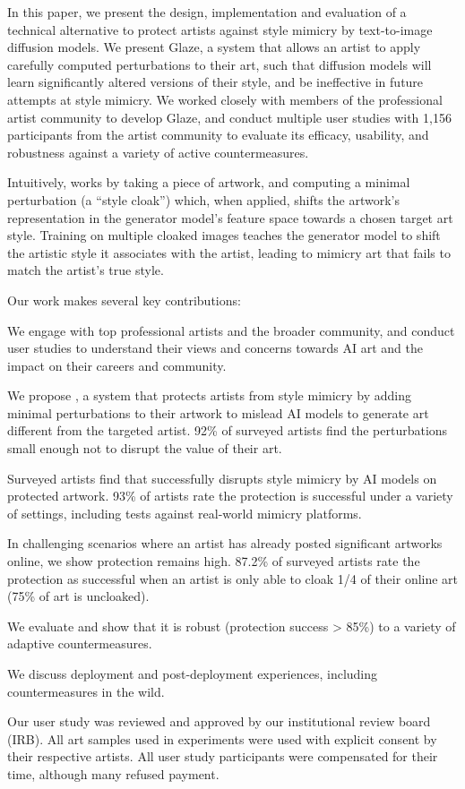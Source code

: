 In this paper, we present the design, implementation and evaluation of a
technical alternative to protect artists against style mimicry by
text-to-image diffusion models. 
We present Glaze, a system that allows an artist to apply carefully
computed perturbations to their art, such that diffusion models will learn
significantly altered versions of their style, and be ineffective in future
attempts at style mimicry. We worked closely with members of the professional
artist community to develop Glaze, and conduct multiple user studies with
1,156 participants from the artist community to evaluate its efficacy,
usability, and robustness against a variety of active countermeasures.

Intuitively, \system{} works by taking a piece of artwork, and computing a
minimal perturbation (a ``style cloak'') which, when applied, shifts the artwork's
representation in the generator model's feature space towards a chosen target
art style. Training on multiple cloaked images teaches the generator model
to shift the artistic style it associates with the artist, leading to mimicry
art that fails to match the artist's true style.

{Our work makes several key contributions:}
\vspace{-0.1in}
\begin{packed_itemize}
\item We engage with top professional artists and the broader community, and
  conduct user studies to understand their views and concerns towards AI art
  and the impact on their careers and community.
\item We propose \system{}, a system that protects artists from style mimicry
  by adding minimal perturbations to their artwork to mislead AI models to
  generate art different from the targeted artist. 92\% of surveyed artists
  find the perturbations small enough not to disrupt the value of their art. 
\item Surveyed artists find that \system{} successfully disrupts
  style mimicry by AI models on protected artwork. 93\% of 
  artists rate the protection is successful under a variety of settings,
  including tests against real-world mimicry platforms.
\item In challenging scenarios where an artist has already posted significant
  artworks online, we show \system{} protection remains high. 87.2\% of
  surveyed artists rate the protection as successful when an artist is only
  able to cloak 1/4 of their online art (75\% of art is uncloaked).
\item We evaluate \system{} and show that it is robust (protection success
  > 85\%) to a variety of adaptive countermeasures.
\item We discuss \system{} deployment and post-deployment
  experiences, including countermeasures in the wild.  
\end{packed_itemize}

 Our user study was reviewed and approved by our institutional
review board (IRB). All art samples used in experiments were used with
explicit consent by their respective artists. All user study participants
were compensated for their time, although many refused payment. 
